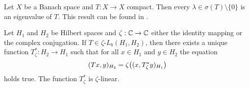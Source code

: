 \begin{remark} \label{remark:compact_spectrum}
	Let $X$ be a Banach space and $T: X \to X$ compact. Then every $\lambda \in \sigma(T) \setminus\{0\}$ is an eigenvalue of $T$. This result can be found in \cite[p.138]{FAna1}.
\end{remark}

\begin{lemma}
	Let $H_1$ and $H_2$ be Hilbert spaces and $\zeta: \mathbb{C} \to \mathbb{C}$ either the identity mapping or the complex conjugation. If $T \in \zeta$-$L_b(H_1, H_2)$, then there exists a unique function $T_\zeta^\ast: H_2 \to H_1$ such that for all $x \in H_1$ and $y \in H_2$ the equation 
	\begin{align*}
		(Tx, y)_{H_2} = \zeta{\left ( (x, T_\zeta^\ast y)_{H_1} \right )}
	\end{align*}
	holds true. The function $T_\zeta^\ast$ is $\zeta$-linear.
\end{lemma}


